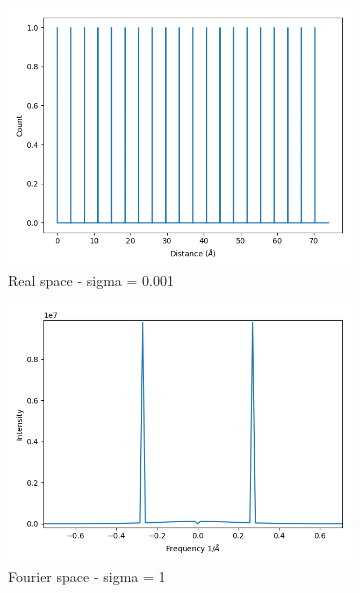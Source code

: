 \documentclass{article}
\begin{document}
\begin{figure}
\begin{subfigure}{0.33\textwidth}
                \centering
                \includegraphics[width=\textwidth]{real_gauss_1d_lowsig.png}
                \caption{Real space - sigma = 0.001}\label{fig:real_gauss_1d_lowsig}
	\end{subfigure}
        \begin{subfigure}{0.33\textwidth}
                \centering
                \includegraphics[width=\textwidth]{fourier_gauss_1d_highsig.png}
                \caption{Fourier space - sigma = 1}\label{fourier_gauss_1d_highsig}
        \end{subfigure}
        \begin{subfigure}{0.33\textwidth}
                \centering

\end{subfigure}
\end{figure}
\end{document}
